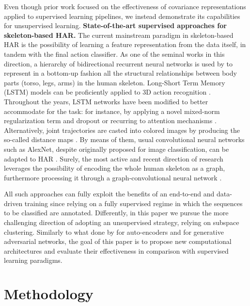 \documentclass[10pt,a4paper,conference]{IEEEtran}
\begin{document}
Even though prior work focused on the effectiveness of covariance representations applied to supervised learning pipelines, we instead demonstrate its capabilities for unsupervised learning.
\newline
\textbf{State-of-the-art supervised approaches for skeleton-based HAR.} The current mainstream paradigm in skeleton-based HAR is the possibility of learning a feature representation from the data itself, in tandem with the final action classifier. As one of the seminal works in this direction, a hierarchy of bidirectional recurrent neural networks is used by \cite{Du:CVPR15} to represent in a bottom-up fashion all the structural relationships between body parts (torso, legs, arms) in the human skeleton. Long-Short Term Memory (LSTM) models can be proficiently applied to 3D action recognition \cite{Shahroudy:CVPR16,Liu:ECCV16}. Throughout the years, LSTM networks have been modified to better accommodate for the task: for instance, by applying a novel mixed-norm regularization term and dropout \cite{Zhu:AAAI16} or recurring to attention mechanisms \cite{Liu:CVPR17}. Alternatively, joint trajectories are casted into colored images by producing the so-called distance maps \cite{JCNN1,JCNN2,Ke:CVPR17}. By means of them, usual convolutional neural networks such as AlexNet, despite originally proposed for image classification, can be adapted to HAR \cite{JCNN1,JCNN2}.
Surely, the most active and recent direction of research leverages the possibility of encoding the whole human skeleton as a graph, furthermore processing it through a graph-convolutional neural network \cite{shi2019two,wu2019spatial}.

All such approaches can fully exploit the benefits of an end-to-end and data-driven training since relying on a fully supervised regime in which the sequences to be classified are annotated. Differently, in this paper we pursue the more challenging direction of adopting an unsupervised strategy, relying on subspace clustering. Similarly to what done by \cite{su2019predict} for auto-encoders and \cite{zheng2018unsupervised} for generative adversarial networks, the goal of this paper is to propose new computational architectures and evaluate their effectiveness in comparison with supervised learning paradigms.

\section{Methodology}\label{sec:method}
\end{document}
